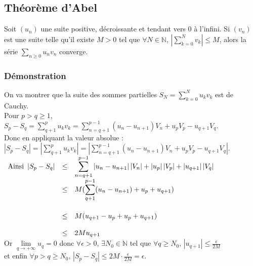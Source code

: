 \documentclass[a4paper,10pt]{book} %
\newcommand{\N}{\mathbb{N}}
\newcommand{\abs}[1]{\left|#1\right|}
\newcommand{\displayAmath}{\displaystyle}
\begin{document}
\newpage

\subsection{Théorème d'Abel}
Soit $(u_n)$ une suite positive, décroissante et tendant vers 0 à l'infini. Si $(v_n)$ est une suite telle qu'il existe $M>0$ tel que $\forall N\in\N$, $\displayAmath\abs{\sum_{k=0}^Nv_k}\leq M$, alors la série $\sum_{n\geq 0}u_nv_n$ converge.

\subsubsection{Démonstration}
On va montrer que la suite des sommes partielles $\displayAmath S_N=\sum_{k=0}^N u_kv_k$ est de Cauchy.\\
Pour $p>q\geq 1$, $\displayAmath S_p-S_q=\sum_{q+1}^pu_kv_k=\sum_{n=q+1}^{p-1} (u_n-u_{n+1})V_n+u_pV_p-u_{q+1}V_q$.\\
Donc en appliquant la valeur absolue : $\displayAmath \abs{S_p-S_q}=\abs{\sum_{q+1}^pu_kv_k}=\abs{\sum_{n=q+1}^{p-1} (u_n-u_{n+1})V_n+u_pV_p-u_{q+1}V_q}$.\\

$\begin{array}{rcl}\text{Ainsi }\abs{S_p-S_q}&\leq& \displayAmath \sum_{n=q+1}^{p-1} \abs{u_n-u_{n+1}}\abs{V_n}+\abs{u_p}\abs{V_p}+\abs{u_{q+1}}\abs{V_q}\\\smallskip
&\leq &\displayAmath  M(\sum_{q+1}^{p-1}(u_n-u_{n+1})+u_p+u_{q+1}) \\\\
&\leq &\displayAmath  M(u_{q+1}-u_p+u_p+u_{q+1})\\\\
&\leq &\displayAmath  2Mu_{q+1}\end{array}$\\

Or $\displayAmath \lim\limits_{q\rightarrow+\infty}u_q=0$ donc $\forall \epsilon>0$, $\exists N_0\in\N$ tel que $\forall q\geq N_0$, $\displayAmath \abs{u_{q+1}}\leq \frac{\epsilon}{2M}$\\et enfin $\forall p>q\geq N_0$, $\displayAmath \abs{S_p-S_{q}}\leq 2M\cdot \frac{\epsilon}{2M}=\epsilon$.
\end{document}
